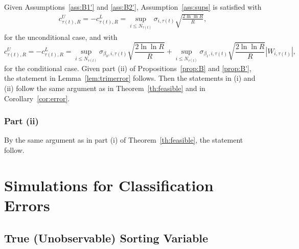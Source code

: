 Given Assumptions~\ref{ass:B1'} and \ref{ass:B2'}, Assumption~\ref{ass:sups} is satisfied with 
\begin{align*}
    c_{\tau(t),R}^{U}=-c_{\tau(t),R}^{L}=\sup_{i\leq N_{\tau(t)}}\sigma _{i,\tau(t)} \sqrt{\frac{2\ln \ln R}{R}},
\end{align*}
for the unconditional case, and with 
\begin{equation*}
c_{\tau(t),R}^{U}=-c_{\tau(t),R}^{L}=\sup_{i\leq N_{\tau(t)}}\sigma _{\beta _{0},i,\tau(t)}%
\sqrt{\frac{2\ln \ln R}{R}}+\sup_{i\leq N_{\tau(t)}}
\sigma _{\beta _{1},i,\tau(t)}\sqrt{\frac{2\ln
\ln R}{R}}\left\vert W_{i,\tau(t)}\right\vert,
\end{equation*}%
for the conditional case. %
Given part (ii) of Propositions~\ref{prop:B} and \ref{prop:B'}, the statement in Lemma~\ref{lem:trimerror} follows. Then the statements in (i) and (ii) follow the same argument as in Theorem~\ref{th:feasible} and in Corollary~\ref{cor:error}.

\subsubsection{Part (ii)}
 
By the same argument as in part (i) of Theorem~\ref{th:feasible}, the statement follow.


\section{Simulations for Classification Errors}
\label{app:Simulations for Classification Errors}

\subsection{True (Unobservable) Sorting Variable}
\label{app:True (Unobservable) Sorting Variable}

